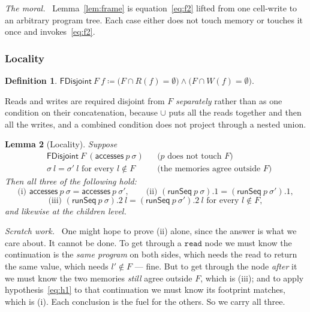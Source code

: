 \documentclass[11pt,a4paper]{article}
\theoremstyle{definition}
\newtheorem{definition}{Definition}
\theoremstyle{plain}
\newtheorem{lemma}[definition]{Lemma}
\theoremstyle{remark}
\newenvironment{scratch}{\par\medskip\noindent\textit{Scratch work.}\ \ignorespaces}{\par\medskip}
\newenvironment{moral}{\par\medskip\noindent\textit{The moral.}\ \ignorespaces}{\par\medskip}
\newcommand{\st}{\sigma}
\newcommand{\reads}[1]{R(#1)}
\newcommand{\writes}[1]{W(#1)}
\newcommand{\acc}{\mathsf{accesses}}
\newcommand{\runSeq}{\mathsf{runSeq}}
\begin{document}
\begin{moral}
Lemma~\ref{lem:frame} is equation~\eqref{eq:f2} lifted from one cell-write to an arbitrary
program tree. Each case either does not touch memory or touches it once and
invokes~\eqref{eq:f2}.
\end{moral}

\subsubsection{Locality}

\begin{definition}\label{def:fdisjoint}
$\mathsf{FDisjoint}\ F\ f \coloneqq \bigl(F \cap \reads{f} = \emptyset\bigr) \wedge
\bigl(F \cap \writes{f} = \emptyset\bigr)$.
\end{definition}

Reads and writes are required disjoint from $F$ \emph{separately} rather than as one
condition on their concatenation, because $\cup$ puts all the reads together and then all
the writes, and a combined condition does not project through a nested union.

\begin{lemma}[Locality]\label{lem:locality}
Suppose
\begin{align}
  &\mathsf{FDisjoint}\ F\ (\acc\ p\ \st) && \text{($p$ does not touch $F$)} \label{eq:h1}\\
  &\st\ l = \st'\ l \text{ for every } l \notin F && \text{(the memories agree outside $F$)} \label{eq:h2}
\end{align}
Then all three of the following hold:
\[
  \text{(i) } \acc\ p\ \st = \acc\ p\ \st', \qquad
  \text{(ii) } (\runSeq\ p\ \st).1 = (\runSeq\ p\ \st').1,
\]
\[
  \text{(iii) } (\runSeq\ p\ \st).2\ l = (\runSeq\ p\ \st').2\ l \text{ for every } l \notin F,
\]
and likewise at the children level.
\end{lemma}

\begin{scratch}
One might hope to prove (ii) alone, since the answer is what we care about. It cannot be
done. To get through a $\texttt{read}$ node we must know the continuation is the \emph{same
program} on both sides, which needs the read to return the same value, which needs
$l' \notin F$ --- fine. But to get through the node \emph{after} it we must know the two
memories \emph{still} agree outside $F$, which is (iii); and to apply
hypothesis~\eqref{eq:h1} to that continuation we must know its footprint matches, which is
(i). Each conclusion is the fuel for the others. So we carry all three.
\end{scratch}
\end{document}
